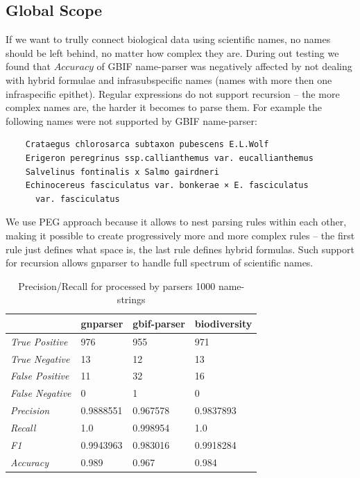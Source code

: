 \documentclass{bmcart}
\begin{document}
\subsection*{Global Scope}

If we want to trully connect biological data using scientific names, no names
should be left behind, no matter how complex they are. During out testing we
found that $Accuracy$ of GBIF name-parser was negatively affected by not
dealing with hybrid formulae and infrasubspecific names (names with more then
one infraspecific epithet). Regular expressions do not support recursion --
the more complex names are, the harder it becomes to parse them. For example
the following names were not supported by GBIF name-parser:

\begin{verbatim}
    Crataegus chlorosarca subtaxon pubescens E.L.Wolf
    Erigeron peregrinus ssp.callianthemus var. eucallianthemus
    Salvelinus fontinalis x Salmo gairdneri
    Echinocereus fasciculatus var. bonkerae × E. fasciculatus
      var. fasciculatus
\end{verbatim}

We use PEG approach because it allows to nest parsing rules within each other,
making it possible to create progressively more and more complex rules -- the
first rule just defines what space is, the last rule defines hybrid formulas.
Such support for recursion allows gnparser to handle full spectrum of
scientific names.

\begin{table}[htb]
  \begin{center}
    \caption{Precision/Recall for processed by parsers 1000
    name-strings}\label{table:precision}
    \begin{tabular}{|l|*{3}{l}|}
      \hline
                             & gnparser & gbif-parser & biodiversity \\
      \hline
      \textit{True Positive} & 976      & 955         & 971          \\
      \textit{True Negative} & 13       & 12          & 13           \\
      \textit{False Positive}& 11       & 32          & 16           \\
      \textit{False Negative}& 0        & 1           & 0            \\
      \textit{Precision}     & 0.9888551& 0.967578    & 0.9837893    \\
      \textit{Recall}        & 1.0      & 0.998954    & 1.0          \\
      \textit{F1}            & 0.9943963& 0.983016    & 0.9918284    \\
      \textit{Accuracy}      & 0.989    & 0.967       & 0.984        \\
      \hline
    \end{tabular}
  \end{center}
\end{table}
\end{document}
